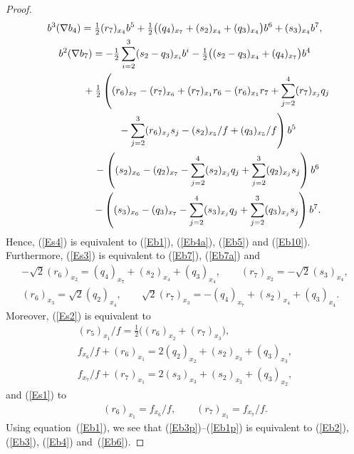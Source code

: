 \begin{proof}
\begin{gather*}
b^3(\nabla b_4) = \tfrac12 (r_7)_{x_4} b^5+\tfrac12\big((q_4)_{x_7}+(s_2)_{x_4}+(q_3)_{x_4}\big) b^6+(s_3)_{x_4} b^7 , \label{En7}\\
b^2(\nabla b_7) = -\tfrac12 \sum_{i=2}^3(s_2-q_3)_{x_i} b^i -\tfrac12 \big((s_2-q_3)_{x_4}+(q_4)_{x_7}\big) b^4 \nonumber \\
\hphantom{b^2(\nabla b_7) =}{} +\tfrac12 \left( (r_6)_{x_7}-(r_7)_{x_6} +(r_7)_{x_1}r_6-(r_6)_{x_1}r_7+\sum_{j=2}^4 (r_7)_{x_j}q_j \right. \nonumber\\
 \left. \hphantom{b^2(\nabla b_7) =}{} -\sum_{j=2}^3 (r_6)_{x_j}s_j -(s_2)_{x_5}/f+(q_3)_{x_5}/f\right) b^5 \label{En8} \\
\hphantom{b^2(\nabla b_7) =}{} -\left((s_2)_{x_6}-(q_2)_{x_7}-\sum_{j=2}^4(s_2)_{x_j}q_j+\sum_{j=2}^3(q_2)_{x_j}s_j\right) b^6 \nonumber\\
\hphantom{b^2(\nabla b_7) =}{} -\left( (s_3)_{x_6}-(q_3)_{x_7}-\sum_{j=2}^4(s_3)_{x_j}q_j+\sum_{j=2}^3(q_3)_{x_j}s_j \right) b^7 .\nonumber
\end{gather*}
Hence, (\ref{Es4}) is equivalent to (\ref{Eb1}), (\ref{Eb4a}), (\ref{Eb5}) and (\ref{Eb10}). Furthermore, (\ref{Es3}) is equivalent to (\ref{Eb7}), (\ref{Eb7a}) and
\begin{gather}
 -\sqrt{2} (r_6)_{x_2}= (q_4)_{x_7}+(s_2)_{x_4}+(q_3)_{x_4},\qquad (r_7)_{x_2}=-\sqrt{2} (s_3)_{x_4},\label{Eb3p}\\
 (r_6)_{x_3}=\sqrt{2} (q_2)_{x_4},\qquad \sqrt{2}(r_7)_{x_3}= -(q_4)_{x_7}+(s_2)_{x_4}+(q_3)_{x_4}.\label{Eb4p}
\end{gather}
Moreover, (\ref{Es2}) is equivalent to
\begin{gather}
(r_5)_{x_1}/f = \tfrac12 \big( (r_6)_{x_2}+(r_7)_{x_3}\big),\label{Ebeg}\\
f_{x_6}/f+(r_6)_{x_1}=2(q_2)_{x_2}+(s_2)_{x_3}+(q_3)_{x_3},\\
f_{x_7}/f+(r_7)_{x_1}=2(s_3)_{x_3}+(s_2)_{x_2}+(q_3)_{x_2},\label{Eend}
\end{gather}
and (\ref{Es1}) to
\begin{gather}\label{Eb1p}
(r_6)_{x_1}=f_{x_6}/f, \qquad (r_7)_{x_1}=f_{x_7}/f.
\end{gather}
Using equation~(\ref{Eb1}), we see that (\ref{Eb3p})--(\ref{Eb1p}) is equivalent to (\ref{Eb2}), (\ref{Eb3}), (\ref{Eb4}) \linebreak and~(\ref{Eb6}).
 \end{proof}


